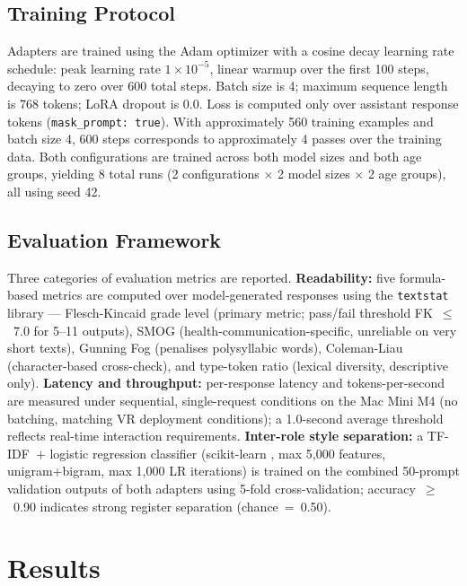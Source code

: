 \documentclass[AMA,Times1COL]{WileyNJDv5} %
\begin{document}
\subsection{Training Protocol}

Adapters are trained using the Adam optimizer with a cosine decay learning rate schedule: peak learning rate $1 \times 10^{-5}$, linear warmup over the first 100 steps, decaying to zero over 600 total steps. Batch size is 4; maximum sequence length is 768 tokens; LoRA dropout is 0.0. Loss is computed only over assistant response tokens (\texttt{mask\_prompt: true}). With approximately 560 training examples and batch size 4, 600 steps corresponds to approximately 4 passes over the training data. Both configurations are trained across both model sizes and both age groups, yielding 8 total runs (2 configurations $\times$ 2 model sizes $\times$ 2 age groups), all using seed 42.

\subsection{Evaluation Framework}

Three categories of evaluation metrics are reported. \textbf{Readability:} five formula-based metrics are computed over model-generated responses using the \texttt{textstat} library \cite{bansal2023textstat} --- Flesch-Kincaid grade level \cite{kincaid1975fk} (primary metric; pass/fail threshold FK~$\leq$~7.0 for 5--11 outputs), SMOG \cite{mclaughlin1969smog} (health-communication-specific, unreliable on very short texts), Gunning Fog \cite{gunning1952fog} (penalises polysyllabic words), Coleman-Liau \cite{coleman1975cli} (character-based cross-check), and type-token ratio (lexical diversity, descriptive only). \textbf{Latency and throughput:} per-response latency and tokens-per-second are measured under sequential, single-request conditions on the Mac Mini M4 (no batching, matching VR deployment conditions); a 1.0-second average threshold reflects real-time interaction requirements. \textbf{Inter-role style separation:} a TF-IDF~$+$ logistic regression classifier (scikit-learn \cite{pedregosa2011sklearn}, max 5{,}000 features, unigram+bigram, max 1{,}000 LR iterations) is trained on the combined 50-prompt validation outputs of both adapters using 5-fold cross-validation; accuracy~$\geq$~0.90 indicates strong register separation (chance~=~0.50).

\section{Results}\label{sec5}
\end{document}
